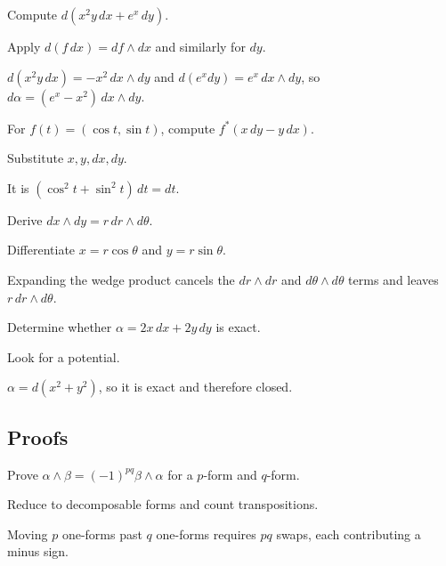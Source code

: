 \begin{exercise}\label{exr:vii09-ped-02}
Compute \(d(x^2y\,dx+e^x\,dy)\).
\end{exercise}
\begin{hint}
Apply \(d(f\,dx)=df\wedge dx\) and similarly for \(dy\).
\end{hint}
\begin{solution}
\(d(x^2y\,dx)=-x^2\,dx\wedge dy\) and \(d(e^xdy)=e^x\,dx\wedge dy\), so \(d\alpha=(e^x-x^2)\,dx\wedge dy\).
\end{solution}

\begin{exercise}\label{exr:vii09-ped-03}
For \(f(t)=(\cos t,\sin t)\), compute \(f^*(x\,dy-y\,dx)\).
\end{exercise}
\begin{hint}
Substitute \(x,y,dx,dy\).
\end{hint}
\begin{solution}
It is \((\cos^2t+\sin^2t)\,dt=dt\).
\end{solution}

\begin{exercise}\label{exr:vii09-ped-04}
Derive \(dx\wedge dy=r\,dr\wedge d\theta\).
\end{exercise}
\begin{hint}
Differentiate \(x=r\cos\theta\) and \(y=r\sin\theta\).
\end{hint}
\begin{solution}
Expanding the wedge product cancels the \(dr\wedge dr\) and \(d\theta\wedge d\theta\) terms and leaves \(r\,dr\wedge d\theta\).
\end{solution}

\begin{exercise}\label{exr:vii09-ped-05}
Determine whether \(\alpha=2x\,dx+2y\,dy\) is exact.
\end{exercise}
\begin{hint}
Look for a potential.
\end{hint}
\begin{solution}
\(\alpha=d(x^2+y^2)\), so it is exact and therefore closed.
\end{solution}

\subsection*{Proofs}

\begin{exercise}\label{exr:vii09-ped-06}
Prove \(\alpha\wedge\beta=(-1)^{pq}\beta\wedge\alpha\) for a \(p\)-form and \(q\)-form.
\end{exercise}
\begin{hint}
Reduce to decomposable forms and count transpositions.
\end{hint}
\begin{solution}
Moving \(p\) one-forms past \(q\) one-forms requires \(pq\) swaps, each contributing a minus sign.
\end{solution}

